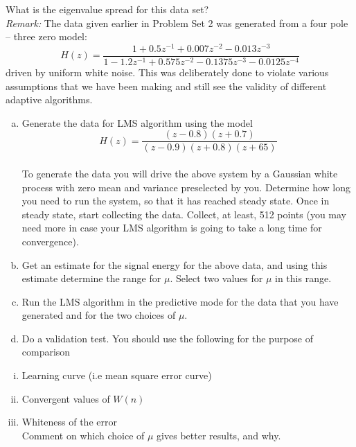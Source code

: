 \documentclass[journal,12pt,onecolumn]{IEEEtran}
\begin{document}
\begin{enumerate}
What is the eigenvalue spread for this data set?\\
\textit{Remark:}
The data given earlier in Problem Set 2 was generated from a four pole – three zero model:\\
$$H(z)= \frac{1+{0.5z^{-1}}+0.007z^{-2}-0.013z^{-3}}{1-1.2z^{-1}+0.575z^{-2}-0.1375z^{-3}-0.0125z^{-4}}$$
driven by uniform white noise. This was deliberately done to violate various assumptions that we have been making and still see the validity of different adaptive algorithms.
\medskip
\begin{enumerate}[(a)]
\item Generate the data for LMS algorithm using the model\\
$$H(z)= \frac{(z-0.8)(z+0.7)}{(z-0.9)(z+0.8)(z+65)}$$\\
\bigskip
To generate the data you will drive the above system by a Gaussian white process with zero mean and variance preselected by you. Determine how long you need to run the system, so that it has reached steady state. Once in steady state, start collecting the data. Collect, at least, 512 points (you may need more in case your LMS algorithm is going to take a long time for convergence).
\smallskip
\item Get an estimate for the signal energy for the above data, and using this estimate determine the range for $\mu.$ 
Select two values for $\mu$ in this range.
\item Run the LMS algorithm in the predictive mode for the data that you have generated and for the two choices of $\mu.$
\item Do a validation test. You should use the following for the purpose of comparison
\end{enumerate}
\begin{enumerate}[i.]
\item Learning curve (i.e mean square error curve)\\
\item Convergent values of $W(n)$\\
\item Whiteness of the error\\
Comment on which choice of $\mu$ gives better results, and why.
\end{enumerate}
\end{enumerate}
\end{document}

